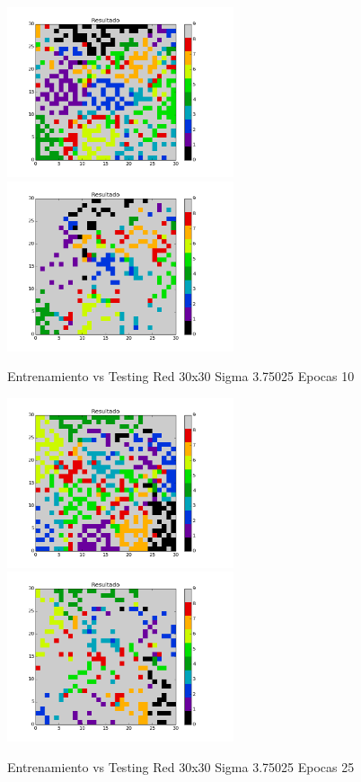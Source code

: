 \includegraphics[width=0.5\textwidth]{img/Ej2_Epocas/train_M_30_sigma_3_75025_epocas_10}
\includegraphics[width=0.5\textwidth]{img/Ej2_Epocas/test_M_30_sigma_3_75025_epocas_10}
{\center \footnotesize Entrenamiento vs Testing Red 30x30 Sigma 3.75025 Epocas 10\par}

\includegraphics[width=0.5\textwidth]{img/Ej2_Epocas/train_M_30_sigma_3_75025_epocas_25}
\includegraphics[width=0.5\textwidth]{img/Ej2_Epocas/test_M_30_sigma_3_75025_epocas_25}
{\center \footnotesize Entrenamiento vs Testing Red 30x30 Sigma 3.75025 Epocas 25\par}


